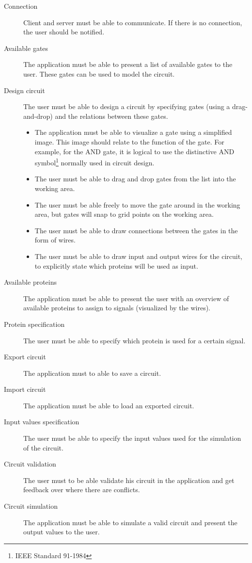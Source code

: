 \documentclass[a4paper]{article}
\begin{document}
\begin{description}
\item[Connection] Client and server must be able to communicate. If there is no connection, the user should be notified.
\item[Available gates] The application must be able to present a list of available gates to the user. These gates can be used to model the circuit.
\item[Design circuit] The user must be able to design a circuit by specifying gates (using a drag-and-drop) and the relations between these gates.
	\begin{itemize}
	\item The application must be able to visualize a gate using a simplified image. This image should relate to the function of the gate. For example, for the AND gate, it is logical to use the distinctive AND symbol\footnote{IEEE Standard 91-1984} normally used in circuit design.
	\item The user must be able to drag and drop gates from the list into the working area.
	\item The user must be able freely to move the gate around in the working area, but gates will snap to grid points on the working area.
	\item The user must be able to draw connections between the gates in the form of wires.
	\item The user must be able to draw input and output wires for the circuit, to explicitly state which proteins will be used as input.
	\end{itemize}
\item[Available proteins] The application must be able to present the user with an overview of available proteins to assign to signals (visualized by the wires).
\item[Protein specification] The user must be able to specify which protein is used for a certain signal.
\item[Export circuit] The application must to able to save a circuit.
\item[Import circuit] The application must be able to load an exported circuit.
\item[Input values specification] The user must be able to specify the input values used for the simulation of the circuit.
\item[Circuit validation] The user must to be able validate his circuit in the application and get feedback over where there are conflicts.
\item[Circuit simulation] The application must be able to simulate a valid circuit and present the output values to the user.
\end{description}
\end{document}
